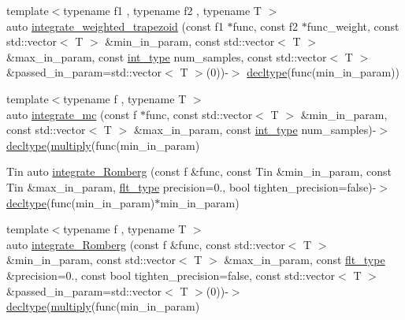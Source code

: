 \begin{DoxyCompactItemize}
\item 
{\footnotesize template$<$typename f1 , typename f2 , typename T $>$ }\\auto \hyperlink{namespaceIceBRG_a5022c662a850dda7068a5aa61650f90b}{integrate\-\_\-weighted\-\_\-trapezoid} (const f1 $\ast$func, const f2 $\ast$func\-\_\-weight, const std\-::vector$<$ T $>$ \&min\-\_\-in\-\_\-param, const std\-::vector$<$ T $>$ \&max\-\_\-in\-\_\-param, const \hyperlink{lib_2IceBRG__main_2common_8h_ac4de9d9335536ac22821171deec8d39e}{int\-\_\-type} num\-\_\-samples, const std\-::vector$<$ T $>$ \&passed\-\_\-in\-\_\-param=std\-::vector$<$ T $>$(0))-\/$>$ \hyperlink{namespaceIceBRG_a528e5024ecab03049320529180ae84a8}{decltype}(func(min\-\_\-in\-\_\-param))
\item 
{\footnotesize template$<$typename f , typename T $>$ }\\auto \hyperlink{namespaceIceBRG_ad4da4152e4d4d3cc66927c687e4d9b58}{integrate\-\_\-mc} (const f $\ast$func, const std\-::vector$<$ T $>$ \&min\-\_\-in\-\_\-param, const std\-::vector$<$ T $>$ \&max\-\_\-in\-\_\-param, const \hyperlink{lib_2IceBRG__main_2common_8h_ac4de9d9335536ac22821171deec8d39e}{int\-\_\-type} num\-\_\-samples)-\/$>$ \hyperlink{namespaceIceBRG_a528e5024ecab03049320529180ae84a8}{decltype}(\hyperlink{namespaceIceBRG_ab535c998baac3ffc8412fdbae750b7d1}{multiply}(func(min\-\_\-in\-\_\-param)
\item 
Tin auto \hyperlink{namespaceIceBRG_a0e6c29343ae00962e82baac43dbcf218}{integrate\-\_\-\-Romberg} (const f \&func, const Tin \&min\-\_\-in\-\_\-param, const Tin \&max\-\_\-in\-\_\-param, \hyperlink{lib_2IceBRG__main_2common_8h_ad0f130a56eeb944d9ef2692ee881ecc4}{flt\-\_\-type} precision=0., bool tighten\-\_\-precision=false)-\/$>$ \hyperlink{namespaceIceBRG_a528e5024ecab03049320529180ae84a8}{decltype}(func(min\-\_\-in\-\_\-param)$\ast$min\-\_\-in\-\_\-param)
\item 
{\footnotesize template$<$typename f , typename T $>$ }\\auto \hyperlink{namespaceIceBRG_aa50843627e51f1027baf470bcb056a5c}{integrate\-\_\-\-Romberg} (const f \&func, const std\-::vector$<$ T $>$ \&min\-\_\-in\-\_\-param, const std\-::vector$<$ T $>$ \&max\-\_\-in\-\_\-param, const \hyperlink{lib_2IceBRG__main_2common_8h_ad0f130a56eeb944d9ef2692ee881ecc4}{flt\-\_\-type} \&precision=0., const bool tighten\-\_\-precision=false, const std\-::vector$<$ T $>$ \&passed\-\_\-in\-\_\-param=std\-::vector$<$ T $>$(0))-\/$>$ \hyperlink{namespaceIceBRG_a528e5024ecab03049320529180ae84a8}{decltype}(\hyperlink{namespaceIceBRG_ab535c998baac3ffc8412fdbae750b7d1}{multiply}(func(min\-\_\-in\-\_\-param)

\end{DoxyCompactItemize}
